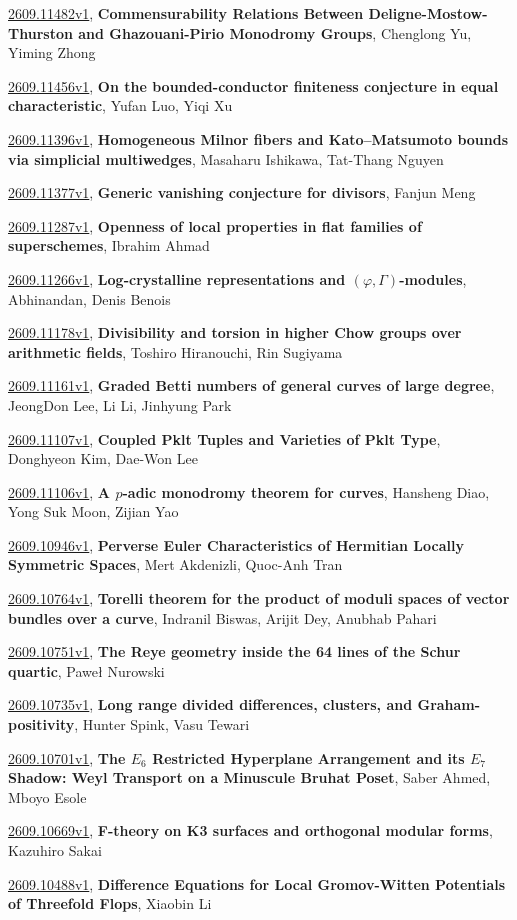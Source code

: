 \documentclass[9pt, a4paper]{article}
\theoremstyle{plain}
\theoremstyle{definition}
\theoremstyle{remark}
\newcommand{\arxiv}[3]{\href{https://arxiv.org/abs/#1}{#1}, \textbf{\textcolor{arxivblue}{#2}}, #3}
\begin{document}
\arxiv{2609.11482v1}{Commensurability Relations Between Deligne-Mostow-Thurston and Ghazouani-Pirio Monodromy Groups}{Chenglong Yu, Yiming Zhong}

\arxiv{2609.11456v1}{On the bounded-conductor finiteness conjecture in equal characteristic}{Yufan Luo, Yiqi Xu}

\arxiv{2609.11396v1}{Homogeneous Milnor fibers and Kato--Matsumoto bounds via simplicial multiwedges}{Masaharu Ishikawa, Tat-Thang Nguyen}

\arxiv{2609.11377v1}{Generic vanishing conjecture for divisors}{Fanjun Meng}

\arxiv{2609.11287v1}{Openness of local properties in flat families of superschemes}{Ibrahim Ahmad}

\arxiv{2609.11266v1}{Log-crystalline representations and $(\varphi, Γ)$-modules}{ Abhinandan, Denis Benois}

\arxiv{2609.11178v1}{Divisibility and torsion in higher Chow groups over arithmetic fields}{Toshiro Hiranouchi, Rin Sugiyama}

\arxiv{2609.11161v1}{Graded Betti numbers of general curves of large degree}{JeongDon Lee, Li Li, Jinhyung Park}

\arxiv{2609.11107v1}{Coupled Pklt Tuples and Varieties of Pklt Type}{Donghyeon Kim, Dae-Won Lee}

\arxiv{2609.11106v1}{A $p$-adic monodromy theorem for curves}{Hansheng Diao, Yong Suk Moon, Zijian Yao}

\arxiv{2609.10946v1}{Perverse Euler Characteristics of Hermitian Locally Symmetric Spaces}{Mert Akdenizli, Quoc-Anh Tran}

\arxiv{2609.10764v1}{Torelli theorem for the product of moduli spaces of vector bundles over a curve}{Indranil Biswas, Arijit Dey, Anubhab Pahari}

\arxiv{2609.10751v1}{The Reye geometry inside the 64 lines of the Schur quartic}{Paweł Nurowski}

\arxiv{2609.10735v1}{Long range divided differences, clusters, and Graham-positivity}{Hunter Spink, Vasu Tewari}

\arxiv{2609.10701v1}{The $E_6$ Restricted Hyperplane Arrangement and its $E_7$ Shadow: Weyl Transport on a Minuscule Bruhat Poset}{Saber Ahmed, Mboyo Esole}

\arxiv{2609.10669v1}{F-theory on K3 surfaces and orthogonal modular forms}{Kazuhiro Sakai}

\arxiv{2609.10488v1}{Difference Equations for Local Gromov-Witten Potentials of Threefold Flops}{Xiaobin Li}
\end{document}
